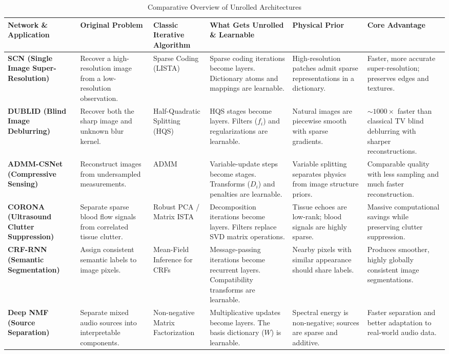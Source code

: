 \documentclass[conference]{IEEEtran}
\begin{document}
\begin{table}[t!]
\caption{Comparative Overview of Unrolled Architectures}
\centering
\renewcommand{\arraystretch}{1.3}
\begin{tabular}{|p{2.5cm}|p{2.5cm}|p{2.5cm}|p{2.5cm}|p{2.5cm}|p{2.5cm}|}
\hline
\textbf{Network \& Application} & \textbf{Original Problem} & \textbf{Classic Iterative Algorithm} & \textbf{What Gets Unrolled \& Learnable} & \textbf{Physical Prior} & \textbf{Core Advantage} \\ \hline
\textbf{SCN (Single Image Super-Resolution)} & Recover a high-resolution image from a low-resolution observation. & Sparse Coding (LISTA) & Sparse coding iterations become layers. Dictionary atoms and mappings are learnable. & High-resolution patches admit sparse representations in a dictionary. & Faster, more accurate super-resolution; preserves edges and textures. \\ \hline
\textbf{DUBLID (Blind Image Deblurring)} & Recover both the sharp image and unknown blur kernel. & Half-Quadratic Splitting (HQS) & HQS stages become layers. Filters ($f_i$) and regularizations are learnable. & Natural images are piecewise smooth with sparse gradients. & $\sim 1000\times$ faster than classical TV blind deblurring with sharper reconstructions. \\ \hline
\textbf{ADMM-CSNet (Compressive Sensing)} & Reconstruct images from undersampled measurements. & ADMM & Variable-update steps become stages. Transforms ($D_i$) and penalties are learnable. & Variable splitting separates physics from image structure priors. & Comparable quality with less sampling and much faster reconstruction. \\ \hline
\textbf{CORONA (Ultrasound Clutter Suppression)} & Separate sparse blood flow signals from correlated tissue clutter. & Robust PCA / Matrix ISTA & Decomposition iterations become layers. Filters replace SVD matrix operations. & Tissue echoes are low-rank; blood signals are highly sparse. & Massive computational savings while preserving clutter suppression. \\ \hline
\textbf{CRF-RNN (Semantic Segmentation)} & Assign consistent semantic labels to image pixels. & Mean-Field Inference for CRFs & Message-passing iterations become recurrent layers. Compatibility transforms are learnable. & Nearby pixels with similar appearance should share labels. & Produces smoother, highly globally consistent image segmentations. \\ \hline
\textbf{Deep NMF (Source Separation)} & Separate mixed audio sources into interpretable components. & Non-negative Matrix Factorization & Multiplicative updates become layers. The basis dictionary ($W$) is learnable. & Spectral energy is non-negative; sources are sparse and additive. & Faster separation and better adaptation to real-world audio data. \\ \hline

\end{tabular}
\end{table}
\end{document}
